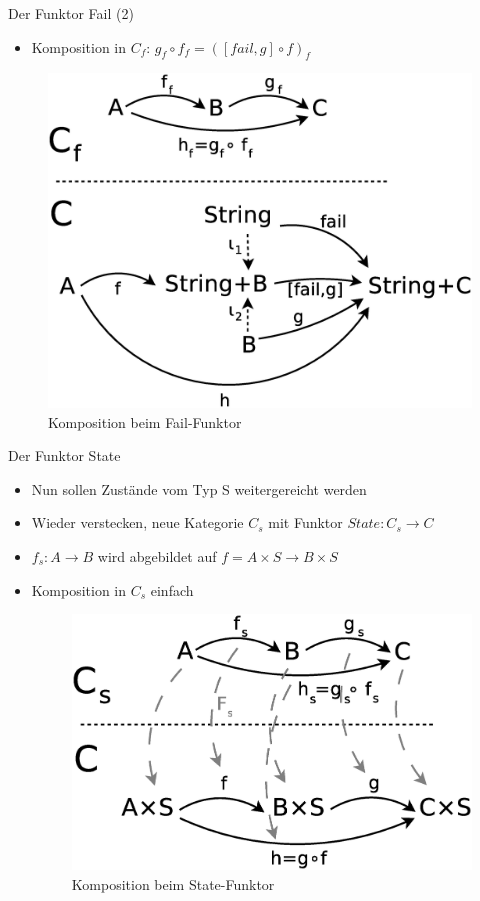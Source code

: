 \documentclass{beamer}
\begin{document}
\begin{frame}{Der Funktor Fail (2)}
  \begin{itemize}
  \item Komposition in $C_{f}$:  $g_{f} \circ f_{f} = ([fail,g] \circ f)_{f}$ 
  \end{itemize}
  \begin{figure}
    \centering
    \includegraphics[scale=0.3]{images/cat_fail}
    \caption{Komposition beim Fail-Funktor}
  \end{figure}
\end{frame}

\begin{frame}{Der Funktor State}
  \begin{itemize}
  \item Nun sollen Zustände vom Typ S weitergereicht werden
  \item Wieder verstecken, neue Kategorie $C_{s}$ mit Funktor
    $State : C_{s} \rightarrow C$
  \item $f_{s} : A \rightarrow B$ wird abgebildet auf
    $f = A \times S \rightarrow B \times S$
  \item Komposition in $C_{s}$ einfach
    \begin{figure}
      \centering
      \includegraphics[scale=0.2]{images/cat_state}
      \caption{Komposition beim State-Funktor}
    \end{figure}
  \end{itemize}
\end{frame}
\end{document}
